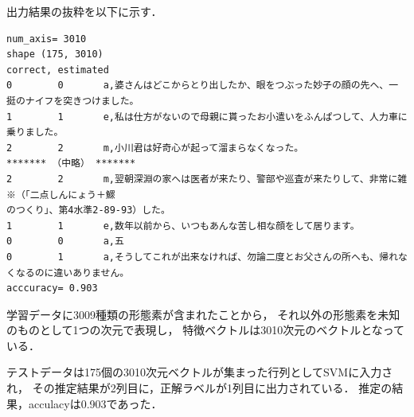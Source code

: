 \documentclass[a4paper, lualatex, ja=standard]{bxjsarticle}
\begin{document}
出力結果の抜粋を以下に示す．

\begin{Verbatim}
num_axis= 3010
shape (175, 3010)
correct, estimated
0        0       a,婆さんはどこからとり出したか、眼をつぶった妙子の顔の先へ、一挺のナイフを突きつけました。
1        1       e,私は仕方がないので母親に貰ったお小遣いをふんぱつして、人力車に乗りました。
2        2       m,小川君は好奇心が起って溜まらなくなった。
******* （中略） *******
2        2       m,翌朝深淵の家へは医者が来たり、警部や巡査が来たりして、非常に雑※（「二点しんにょう＋鰥
のつくり」、第4水準2-89-93）した。
1        1       e,数年以前から、いつもあんな苦し相な顔をして居ります。
0        0       a,五
0        1       a,そうしてこれが出来なければ、勿論二度とお父さんの所へも、帰れなくなるのに違いありません。
acccuracy= 0.903
\end{Verbatim}

学習データに3009種類の形態素が含まれたことから，
それ以外の形態素を未知のものとして1つの次元で表現し，
特徴ベクトルは3010次元のベクトルとなっている．

テストデータは175個の3010次元ベクトルが集まった行列としてSVMに入力され，
その推定結果が2列目に，正解ラベルが1列目に出力されている．
推定の結果，acculacyは0.903であった．
\end{document}
